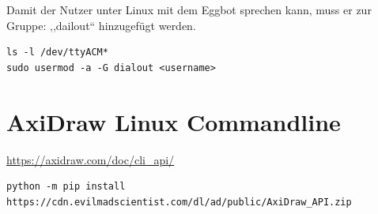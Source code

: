 Damit der Nutzer unter Linux mit dem Eggbot sprechen kann, muss er zur Gruppe: ,,dailout`` hinzugefügt werden.\\
\begin{verbatim}
ls -l /dev/ttyACM*
sudo usermod -a -G dialout <username>
\end{verbatim}
\section{AxiDraw Linux Commandline}
\url{https://axidraw.com/doc/cli_api/}
\begin{verbatim}
python -m pip install https://cdn.evilmadscientist.com/dl/ad/public/AxiDraw_API.zip
\end{verbatim}



